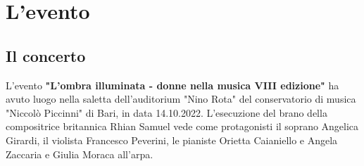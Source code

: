 \newcommand{\mylanguages}{italian} %
\newcommand{\mytitle}{Limiti elettroacustici}
\newcommand{\mysubtitle}{Un approccio per rappresentare al meglio una fonte sonora}
\newcommand{\authorone}{Giancarlo Bottalico}
\newcommand{\institutione}{Conservatorio di musica "N. Piccinni", Bari}
\newcommand{\emailone}{giancarlobottalico@gmail.com}


	\maketitle
	\thispagestyle{empty}

\section{L'evento}

	\subsection{Il concerto}
	L'evento \textbf{"L'ombra illuminata - donne nella musica VIII edizione"} ha avuto luogo nella saletta dell'auditorium "Nino Rota" del conservatorio di musica "Niccolò Piccinni" di Bari, in data 14.10.2022. L'esecuzione del brano della compositrice britannica Rhian Samuel vede come protagonisti il soprano Angelica Girardi, il violista Francesco Peverini, le pianiste Orietta Caianiello e Angela Zaccaria e Giulia Moraca all'arpa.
		
